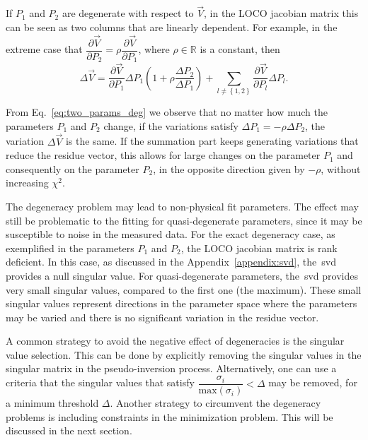 If $P_1$ and $P_2$ are degenerate with respect to $\vec{V}$, in the LOCO jacobian matrix this can be seen as two columns that are linearly dependent. For example, in the extreme case that $\dfrac{\partial \vec{V}}{\partial P_{2}} = \rho \dfrac{\partial \vec{V}}{\partial P_{1}}$, where $\rho \in \mathbb{R}$ is a constant, then 
\begin{equation}
\Delta \vec{V} = \dfrac{\partial \vec{V}}{\partial P_{1}} \Delta P_{1}\left(1 + \rho \dfrac{\Delta P_2}{\Delta P_1}\right) + \sum_{l \neq \left\{1,2\right\}}\dfrac{\partial \vec{V}}{\partial P_{l}} \Delta P_{l}.
\label{eq:two_params_deg}
\end{equation}

From Eq.~\eqref{eq:two_params_deg} we observe that no matter how much the parameters $P_1$ and $P_2$ change, if the variations satisfy $\Delta P_1 = - \rho \Delta P_2$, the variation $\Delta \vec{V}$ is the same. If the summation part keeps generating variations that reduce the residue vector, this allows for large changes on the parameter $P_1$ and consequently on the parameter $P_2$, in the opposite direction given by $-\rho$, without increasing $\chi^2$.

The degeneracy problem may lead to non-physical fit parameters. The effect may still be problematic to the fitting for quasi-degenerate parameters, since it may be susceptible to noise in the measured data. For the exact degeneracy case, as exemplified in the parameters $P_1$ and $P_2$, the LOCO jacobian matrix is rank deficient. In this case, as discussed in the Appendix~\ref{appendix:svd}, the~\gls{svd} provides a null singular value. For quasi-degenerate parameters, the~\gls{svd} provides very small singular values, compared to the first one (the maximum). These small singular values represent directions in the parameter space where the parameters may be varied and there is no significant variation in the residue vector. 

A common strategy to avoid the negative effect of degeneracies is the singular value selection. This can be done by explicitly removing the singular values in the singular matrix in the pseudo-inversion process. Alternatively, one can use a criteria that the singular values that satisfy $\dfrac{\sigma_i}{\mathrm{max}\left(\sigma_i\right)} < \Delta$ may be removed, for a minimum threshold $\Delta$. Another strategy to circumvent the degeneracy problems is including constraints in the minimization problem. This will be discussed in the next section.

